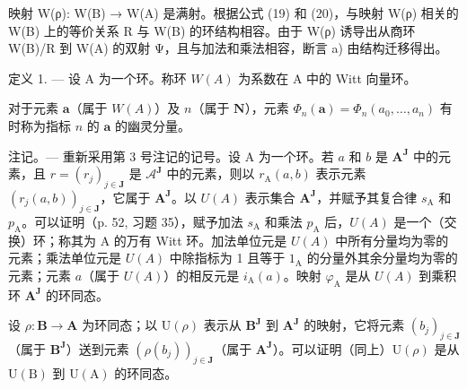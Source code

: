 映射 W(ρ): W(B) → W(A) 是满射。根据公式 (19) 和 (20)，与映射 W(ρ) 相关的 W(B) 上的等价关系 R 与 W(B) 的环结构相容。由于 W(ρ) 诱导出从商环 W(B)/R 到 W(A) 的双射 Ψ，且与加法和乘法相容，断言 a) 由结构迁移得出。

定义 1. --- 设 A 为一个环。称环 \(W(A)\) 为系数在 A 中的 Witt 向量环。

对于元素 \(\boldsymbol{a}\)（属于 \(W(A)\)）及 \(n\)（属于 \(\mathbf{N}\)），元素 \(\Phi_n(\boldsymbol{a}) = \Phi_n(a_0, \ldots, a_n)\) 有时称为指标 \(n\) 的 \(\boldsymbol{a}\) 的幽灵分量。

注记。--- 重新采用第 3 号注记的记号。设 A 为一个环。若 \(a\) 和 \(b\) 是 \(\mathbf{A}^{\mathbf{J}}\) 中的元素，且 \(r = (r_{j})_{j\in\mathbf{J}}\) 是 \(\mathcal{A}^{\mathbf{J}}\) 中的元素，则以 \(r_{\mathrm{A}}(a,b)\) 表示元素 \((r_{j}(a,b))_{j\in\mathbf{J}}\)，它属于 \(\mathbf{A}^{\mathbf{J}}\)。以 \(U(A)\) 表示集合 \(\mathbf{A}^{\mathbf{J}}\)，并赋予其复合律 \(s_{\mathrm{A}}\) 和 \(p_{\mathrm{A}}\)。可以证明（p. 52, 习题 35），赋予加法 \(s_{\mathrm{A}}\) 和乘法 \(p_{\mathrm{A}}\) 后，\(U(A)\) 是一个（交换）环；称其为 A 的万有 Witt 环。加法单位元是 \(U(A)\) 中所有分量均为零的元素；乘法单位元是 \(U(A)\) 中除指标为 1 且等于 \(1_{\mathrm{A}}\) 的分量外其余分量均为零的元素；元素 \(a\)（属于 \(U(A)\)）的相反元是 \(i_{\mathrm{A}}(a)\)。映射 \(\varphi_{\mathrm{A}}\) 是从 \(U(A)\) 到乘积环 \(\mathbf{A}^{\mathbf{J}}\) 的环同态。

设 \(\rho: \mathbf{B} \to \mathbf{A}\) 为环同态；以 \(\mathrm{U}(\rho)\) 表示从 \(\mathbf{B}^{\mathbf{J}}\) 到 \(\mathbf{A}^{\mathbf{J}}\) 的映射，它将元素 \((b_j)_{j \in \mathbf{J}}\)（属于 \(\mathbf{B}^{\mathbf{J}}\)）送到元素 \((\rho(b_j))_{j \in \mathbf{J}}\)（属于 \(\mathbf{A}^{\mathbf{J}}\)）。可以证明（同上）\(\mathrm{U}(\rho)\) 是从 \(\mathrm{U}(\mathrm{B})\) 到 \(\mathrm{U}(\mathrm{A})\) 的环同态。
\relax{}
